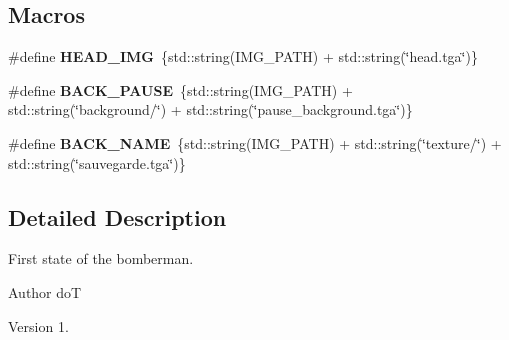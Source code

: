 \subsection*{Macros}
\begin{DoxyCompactItemize}
\item 
\hypertarget{_intro_state_8hh_a17ab9eb3d57c4a1c50bc33b91ff18966}{}\#define {\bfseries H\+E\+A\+D\+\_\+\+I\+M\+G}~\{std\+::string(I\+M\+G\+\_\+\+P\+A\+T\+H) + std\+::string(\char`\"{}head.\+tga\char`\"{})\}\label{_intro_state_8hh_a17ab9eb3d57c4a1c50bc33b91ff18966}

\item 
\hypertarget{_intro_state_8hh_ac45629c8d71bdf47fd2d7e3c9c7642f2}{}\#define {\bfseries B\+A\+C\+K\+\_\+\+P\+A\+U\+S\+E}~\{std\+::string(I\+M\+G\+\_\+\+P\+A\+T\+H) + std\+::string(\char`\"{}background/\char`\"{}) + std\+::string(\char`\"{}pause\+\_\+background.\+tga\char`\"{})\}\label{_intro_state_8hh_ac45629c8d71bdf47fd2d7e3c9c7642f2}

\item 
\hypertarget{_intro_state_8hh_a404d842eac951833590897cc27e10548}{}\#define {\bfseries B\+A\+C\+K\+\_\+\+N\+A\+M\+E}~\{std\+::string(I\+M\+G\+\_\+\+P\+A\+T\+H) + std\+::string(\char`\"{}texture/\char`\"{}) + std\+::string(\char`\"{}sauvegarde.\+tga\char`\"{})\}\label{_intro_state_8hh_a404d842eac951833590897cc27e10548}

\end{DoxyCompactItemize}


\subsection{Detailed Description}
First state of the bomberman. 

\begin{DoxyAuthor}{Author}
do\+T 
\end{DoxyAuthor}
\begin{DoxyVersion}{Version}
1. 
\end{DoxyVersion}
